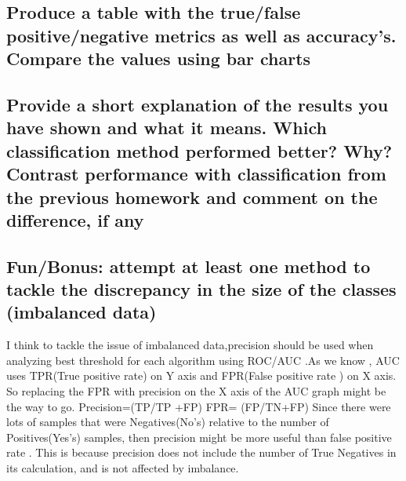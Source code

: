 


\subsection{Produce a table with the true/false positive/negative metrics as well as accuracy's. Compare the values using bar charts}


\subsection{Provide a short explanation of the results you have shown and what it means. Which classification method performed better? Why? Contrast performance with classification from the previous homework and comment on the difference, if any}






\subsection{ Fun/Bonus: attempt at least one method to tackle the discrepancy in the size of the classes (imbalanced data)}
 I think to tackle the issue of imbalanced data,precision should be used when analyzing best threshold for each algorithm using ROC/AUC .As we know , AUC uses TPR(True positive rate) on Y axis and FPR(False positive rate ) on X axis. So replacing the FPR with precision on the X axis of the AUC graph might be the way to go.
 Precision=(TP/TP +FP) FPR= (FP/TN+FP)
 Since there were lots of samples that were Negatives(No's) relative to the number of Positives(Yes's) samples, then precision might be more useful than false positive rate . This is because precision does not include the number of True Negatives in its calculation, and is not affected by imbalance.



